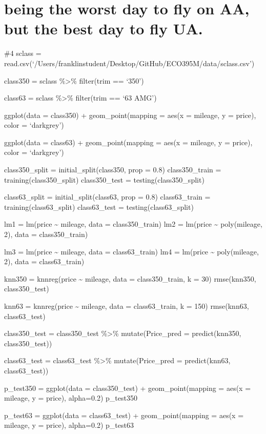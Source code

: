 \documentclass[
]{article}
\begin{document}
\hypertarget{being-the-worst-day-to-fly-on-aa-but-the-best-day-to-fly-ua.}{%
\section{being the worst day to fly on AA, but the best day to fly
UA.}\label{being-the-worst-day-to-fly-on-aa-but-the-best-day-to-fly-ua.}}

\#4 sclass =
read.csv(`/Users/franklinstudent/Desktop/GitHub/ECO395M/data/sclass.csv')

class350 = sclass \%\textgreater\% filter(trim == `350')

class63 = sclass \%\textgreater\% filter(trim == `63 AMG')

ggplot(data = class350) + geom\_point(mapping = aes(x = mileage, y =
price), color = `darkgrey')

ggplot(data = class63) + geom\_point(mapping = aes(x = mileage, y =
price), color = `darkgrey')

class350\_split = initial\_split(class350, prop = 0.8) class350\_train =
training(class350\_split) class350\_test = testing(class350\_split)

class63\_split = initial\_split(class63, prop = 0.8) class63\_train =
training(class63\_split) class63\_test = testing(class63\_split)

lm1 = lm(price \textasciitilde{} mileage, data = class350\_train) lm2 =
lm(price \textasciitilde{} poly(mileage, 2), data = class350\_train)

lm3 = lm(price \textasciitilde{} mileage, data = class63\_train) lm4 =
lm(price \textasciitilde{} poly(mileage, 2), data = class63\_train)

knn350 = knnreg(price \textasciitilde{} mileage, data = class350\_train,
k = 30) rmse(knn350, class350\_test)

knn63 = knnreg(price \textasciitilde{} mileage, data = class63\_train, k
= 150) rmse(knn63, class63\_test)

class350\_test = class350\_test \%\textgreater\% mutate(Price\_pred =
predict(knn350, class350\_test))

class63\_test = class63\_test \%\textgreater\% mutate(Price\_pred =
predict(knn63, class63\_test))

p\_test350 = ggplot(data = class350\_test) + geom\_point(mapping = aes(x
= mileage, y = price), alpha=0.2) p\_test350

p\_test63 = ggplot(data = class63\_test) + geom\_point(mapping = aes(x =
mileage, y = price), alpha=0.2) p\_test63
\end{document}
